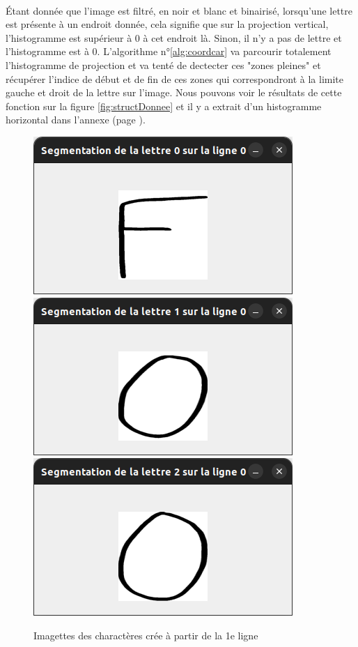 \documentclass[a4paper]{article}
\begin{document}
			\paragraph{} Étant donnée que l'image est filtré, en noir et blanc et binairisé, lorsqu'une lettre est présente à un endroit donnée, cela signifie que sur la projection vertical, l'histogramme est supérieur à 0 à cet endroit là. Sinon, il n'y a pas de lettre et l'histogramme est à 0. L'algorithme n°\ref{alg:coordcar} va parcourir totalement l'histogramme de projection et va tenté de dectecter ces "zones pleines" et récupérer l'indice de début et de fin de ces zones qui correspondront à la limite gauche et droit de la lettre sur l'image. Nous pouvons voir le résultats de cette fonction sur la figure \ref{fig:structDonnee} et il y a extrait d'un histogramme horizontal dans l'annexe (page \pageref{fig:histoX}).
			\begin{figure}
				\includegraphics[scale=.3]{segmentation_F.png}
				\centering
				\includegraphics[scale=.3]{segmentation_O1.png}
				\centering
				\includegraphics[scale=.3]{segmentation_O2.png}
				\centering
				\caption{Imagettes des charactères crée à partir de la 1e ligne}
			\end{figure}
\end{document}
